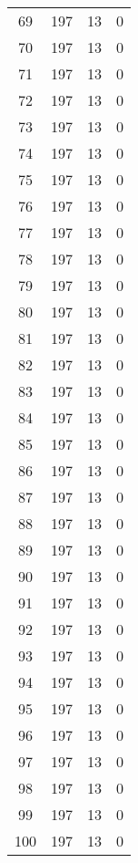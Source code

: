 \begin{longtable}[!]{c|ccc}
	69	& 197	& 13	& 0	\\
	70	& 197	& 13	& 0	\\
	71	& 197	& 13	& 0	\\
	72	& 197	& 13	& 0	\\
	73	& 197	& 13	& 0	\\
	74	& 197	& 13	& 0	\\
	75	& 197	& 13	& 0	\\
	76	& 197	& 13	& 0	\\
	77	& 197	& 13	& 0	\\
	78	& 197	& 13	& 0	\\
	79	& 197	& 13	& 0	\\
	80	& 197	& 13	& 0	\\
	81	& 197	& 13	& 0	\\
	82	& 197	& 13	& 0	\\
	83	& 197	& 13	& 0	\\
	84	& 197	& 13	& 0	\\
	85	& 197	& 13	& 0	\\
	86	& 197	& 13	& 0	\\
	87	& 197	& 13	& 0	\\
	88	& 197	& 13	& 0	\\
	89	& 197	& 13	& 0	\\
	90	& 197	& 13	& 0	\\
	91	& 197	& 13	& 0	\\
	92	& 197	& 13	& 0	\\
	93	& 197	& 13	& 0	\\
	94	& 197	& 13	& 0	\\
	95	& 197	& 13	& 0	\\
	96	& 197	& 13	& 0	\\
	97	& 197	& 13	& 0	\\
	98	& 197	& 13	& 0	\\
	99	& 197	& 13	& 0	\\
	100	& 197	& 13	& 0	\\
\end{longtable}